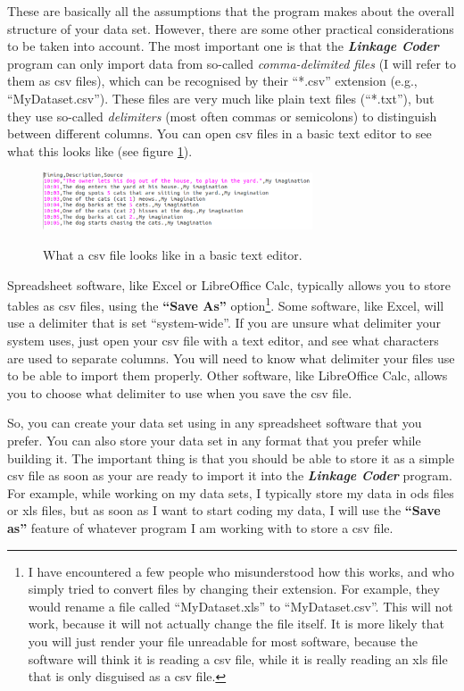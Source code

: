 \documentclass{memoir}
\begin{document}
These are basically all the assumptions that the program makes about the overall structure of your data set. However, there are some other practical considerations to be taken into account. The most important one is that the \textbf{\emph{Linkage Coder}} program can only import data from so-called \emph{comma-delimited files} (I will refer to them as csv files), which can be recognised by their ``*.csv'' extension (e.g., ``My\textunderscore Dataset.csv''). These files are very much like plain text files (``*.txt''), but they use so-called \emph{delimiters} (most often commas or semicolons) to distinguish between different columns. You can open csv files in a basic text editor to see what this looks like (see figure \ref{fig:csvfile}).

\begin{figure}[h!]
  \centering
  \caption{What a csv file looks like in a basic text editor.}
  \includegraphics[width=80mm]{Screenshot_19.pdf}
  \label{fig:csvfile}
\end{figure}

Spreadsheet software, like Excel or LibreOffice Calc, typically allows you to store tables as csv files, using the \textbf{``Save As''} option\footnote{I have encountered a few people who misunderstood how this works, and who simply tried to convert files by changing their extension. For example, they would rename a file called ``My\textunderscore Dataset.xls'' to ``My\textunderscore Dataset.csv''. This will not work, because it will not actually change the file itself. It is more likely that you will just render your file unreadable for most software, because the software will think it is reading a csv file, while it is really reading an xls file that is only disguised as a csv file.}. Some software, like Excel, will use a delimiter that is set ``system-wide''. If you are unsure what delimiter your system uses, just open your csv file with a text editor, and see what characters are used to separate columns. You will need to know what delimiter your files use to be able to import them properly. Other software, like LibreOffice Calc, allows you to choose what delimiter to use when you save the csv file.

So, you can create your data set using in any spreadsheet software that you prefer. You can also store your data set in any format that you prefer while building it. The important thing is that you should be able to store it as a simple csv file as soon as your are ready to import it into the \textbf{\emph{Linkage Coder}} program. For example, while working on my data sets, I typically store my data in ods files or xls files, but as soon as I want to start coding my data, I will use the \textbf{``Save as''} feature of whatever program I am working with to store a csv file.   
\end{document}

